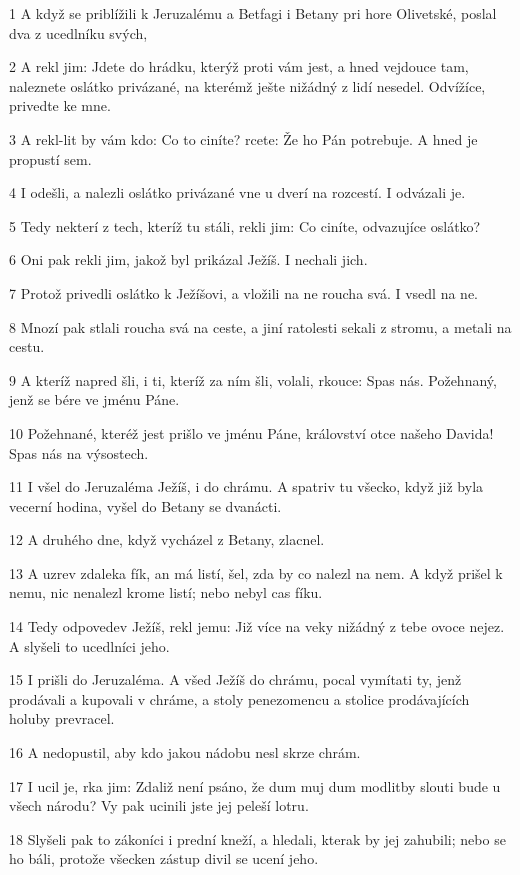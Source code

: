 \par 1 A když se priblížili k Jeruzalému a Betfagi i Betany pri hore Olivetské, poslal dva z ucedlníku svých,
\par 2 A rekl jim: Jdete do hrádku, kterýž proti vám jest, a hned vejdouce tam, naleznete oslátko privázané, na kterémž ješte nižádný z lidí nesedel. Odvížíce, privedte ke mne.
\par 3 A rekl-lit by vám kdo: Co to ciníte? rcete: Že ho Pán potrebuje. A hned je propustí sem.
\par 4 I odešli, a nalezli oslátko privázané vne u dverí na rozcestí. I odvázali je.
\par 5 Tedy nekterí z tech, kteríž tu stáli, rekli jim: Co ciníte, odvazujíce oslátko?
\par 6 Oni pak rekli jim, jakož byl prikázal Ježíš. I nechali jich.
\par 7 Protož privedli oslátko k Ježíšovi, a vložili na ne roucha svá. I vsedl na ne.
\par 8 Mnozí pak stlali roucha svá na ceste, a jiní ratolesti sekali z stromu, a metali na cestu.
\par 9 A kteríž napred šli, i ti, kteríž za ním šli, volali, rkouce: Spas nás. Požehnaný, jenž se bére ve jménu Páne.
\par 10 Požehnané, kteréž jest prišlo ve jménu Páne, království otce našeho Davida! Spas nás na výsostech.
\par 11 I všel do Jeruzaléma Ježíš, i do chrámu. A spatriv tu všecko, když již byla vecerní hodina, vyšel do Betany se dvanácti.
\par 12 A druhého dne, když vycházel z Betany, zlacnel.
\par 13 A uzrev zdaleka fík, an má listí, šel, zda by co nalezl na nem. A když prišel k nemu, nic nenalezl krome listí; nebo nebyl cas fíku.
\par 14 Tedy odpovedev Ježíš, rekl jemu: Již více na veky nižádný z tebe ovoce nejez. A slyšeli to ucedlníci jeho.
\par 15 I prišli do Jeruzaléma. A všed Ježíš do chrámu, pocal vymítati ty, jenž prodávali a kupovali v chráme, a stoly penezomencu a stolice prodávajících holuby prevracel.
\par 16 A nedopustil, aby kdo jakou nádobu nesl skrze chrám.
\par 17 I ucil je, rka jim: Zdaliž není psáno, že dum muj dum modlitby slouti bude u všech národu? Vy pak ucinili jste jej peleší lotru.
\par 18 Slyšeli pak to zákoníci i prední kneží, a hledali, kterak by jej zahubili; nebo se ho báli, protože všecken zástup divil se ucení jeho.
